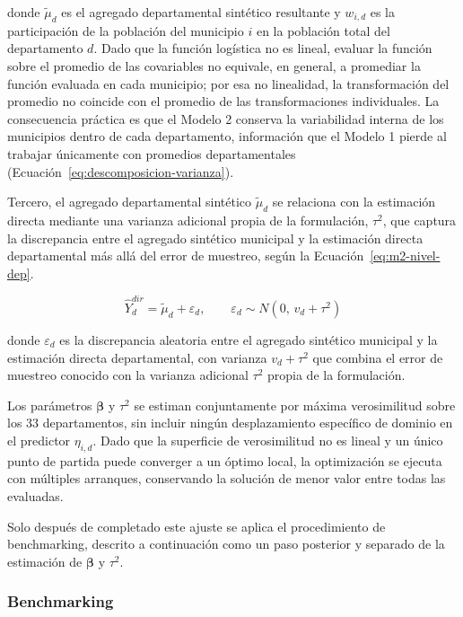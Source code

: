 \noindent donde $\tilde{\mu}_d$ es el agregado departamental sintético resultante y $w_{i,d}$ es la participación de la población del municipio $i$ en la población total del departamento $d$. Dado que la función logística no es lineal, evaluar la función sobre el promedio de las covariables no equivale, en general, a promediar la función evaluada en cada municipio; por esa no linealidad, la transformación del promedio no coincide con el promedio de las transformaciones individuales. La consecuencia práctica es que el Modelo 2 conserva la variabilidad interna de los municipios dentro de cada departamento, información que el Modelo 1 pierde al trabajar únicamente con promedios departamentales (Ecuación~\ref{eq:descomposicion-varianza}).

Tercero, el agregado departamental sintético $\tilde{\mu}_d$ se relaciona con la estimación directa mediante una varianza adicional propia de la formulación, $\tau^2$, que captura la discrepancia entre el agregado sintético municipal y la estimación directa departamental más allá del error de muestreo, según la Ecuación~\ref{eq:m2-nivel-dep}.

\begin{equation}
    \hat{Y}_d^{dir} = \tilde{\mu}_d + \varepsilon_d, \qquad \varepsilon_d \sim N(0,\, v_d + \tau^2)
    \label{eq:m2-nivel-dep}
\end{equation}

\noindent donde $\varepsilon_d$ es la discrepancia aleatoria entre el agregado sintético municipal y la estimación directa departamental, con varianza $v_d+\tau^2$ que combina el error de muestreo conocido con la varianza adicional $\tau^2$ propia de la formulación.

Los parámetros $\boldsymbol{\beta}$ y $\tau^2$ se estiman conjuntamente por máxima verosimilitud sobre los 33 departamentos, sin incluir ningún desplazamiento específico de dominio en el predictor $\eta_{i,d}$. Dado que la superficie de verosimilitud no es lineal y un único punto de partida puede converger a un óptimo local, la optimización se ejecuta con múltiples arranques, conservando la solución de menor valor entre todas las evaluadas.

Solo después de completado este ajuste se aplica el procedimiento de benchmarking, descrito a continuación como un paso posterior y separado de la estimación de $\boldsymbol{\beta}$ y $\tau^2$.

\subsubsection{Benchmarking}
\label{subsec:benchmarking}

